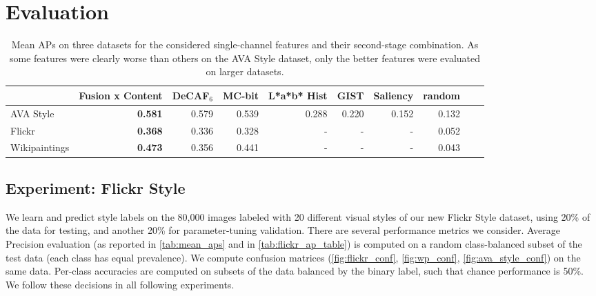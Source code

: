 \section{Evaluation}\label{sec:style_evaluation}

\begin{table}
\caption[Mean APs on AVA Style, Flickr Style, and Wikipaintings for single-channel features and their second-stage combinations.]{
    Mean APs on three datasets for the considered single-channel features and their second-stage combination.
    As some features were clearly worse than others on the AVA Style dataset, only the better features were evaluated on larger datasets.
}
\label{tab:mean_aps}
\centering
\vspace{1em}
\footnotesize{
\begin{tabular}{lrrrrrrrrr}
\toprule
{}                & Fusion x Content & DeCAF$_6$ & MC-bit & L*a*b* Hist & GIST  & Saliency & random \\
\midrule
AVA Style         & \textbf{0.581}   & 0.579     & 0.539  & 0.288       & 0.220 & 0.152    & 0.132 \\
Flickr            & \textbf{0.368}   & 0.336     & 0.328  & -           & -     & -        & 0.052 \\
Wikipaintings     & \textbf{0.473}   & 0.356     & 0.441  & -           & -     & -        & 0.043 \\
\bottomrule
\end{tabular}
}
\end{table}

\subsection{Experiment: Flickr Style}

We learn and predict style labels on the 80,000 images labeled with 20 different visual styles of our new Flickr Style dataset, using 20\% of the data for testing, and another 20\% for parameter-tuning validation.
There are several performance metrics we consider.
Average Precision evaluation (as reported in \autoref{tab:mean_aps} and in \autoref{tab:flickr_ap_table}) is computed on a random class-balanced subset of the test data (each class has equal prevalence).
We compute confusion matrices (\autoref{fig:flickr_conf}, \autoref{fig:wp_conf}, \autoref{fig:ava_style_conf}) on the same data.
Per-class accuracies are computed on subsets of the data balanced by the binary label, such that chance performance is 50\%.
We follow these decisions in all following experiments.


